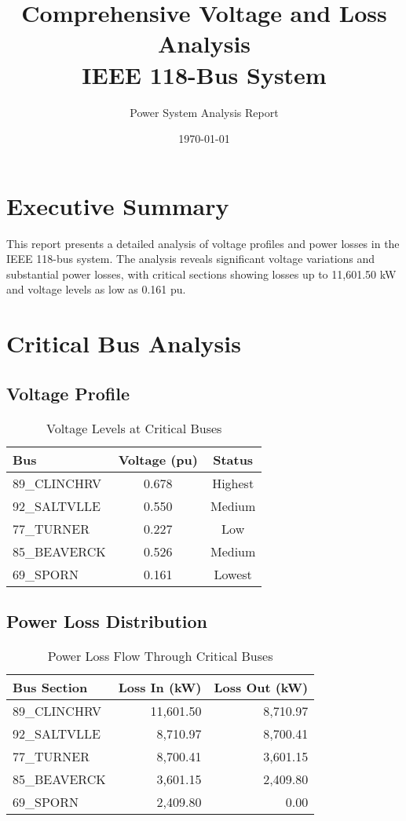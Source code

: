 \documentclass[11pt]{article}
\title{Comprehensive Voltage and Loss Analysis\\IEEE 118-Bus System}
\author{Power System Analysis Report}
\date{\today}
\begin{document}
\maketitle

\section{Executive Summary}
This report presents a detailed analysis of voltage profiles and power losses in the IEEE 118-bus system. The analysis reveals significant voltage variations and substantial power losses, with critical sections showing losses up to 11,601.50 kW and voltage levels as low as 0.161 pu.

\section{Critical Bus Analysis}

\subsection{Voltage Profile}
\begin{table}[H]
\centering
\begin{tabular}{lcc}
\toprule
Bus & Voltage (pu) & Status \\
\midrule
89\_CLINCHRV & 0.678 & Highest \\
92\_SALTVLLE & 0.550 & Medium \\
77\_TURNER & 0.227 & Low \\
85\_BEAVERCK & 0.526 & Medium \\
69\_SPORN & 0.161 & Lowest \\
\bottomrule
\end{tabular}
\caption{Voltage Levels at Critical Buses}
\label{tab:voltage_levels}
\end{table}

\subsection{Power Loss Distribution}
\begin{table}[H]
\centering
\begin{tabular}{lrr}
\toprule
Bus Section & Loss In (kW) & Loss Out (kW) \\
\midrule
89\_CLINCHRV & 11,601.50 & 8,710.97 \\
92\_SALTVLLE & 8,710.97 & 8,700.41 \\
77\_TURNER & 8,700.41 & 3,601.15 \\
85\_BEAVERCK & 3,601.15 & 2,409.80 \\
69\_SPORN & 2,409.80 & 0.00 \\
\bottomrule
\end{tabular}
\caption{Power Loss Flow Through Critical Buses}
\label{tab:power_losses}
\end{table}
\end{document}
